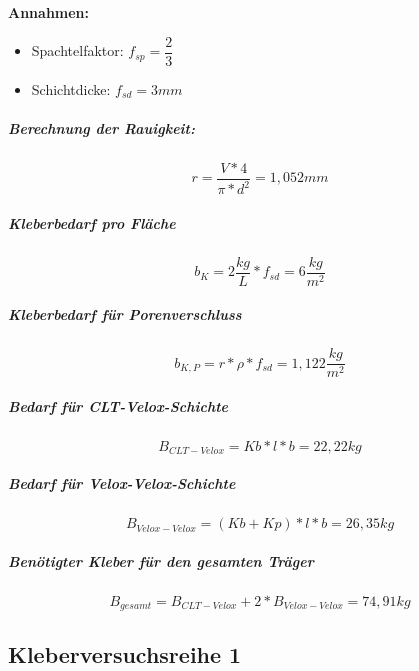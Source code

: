\documentclass[12 pt,a4 paper ]{scrreprt}
\begin{document}
\textbf{Annahmen:}

\begin{itemize}
\item Spachtelfaktor:	$f_{sp}=\dfrac{2}{3}$
\item Schichtdicke:		$f_{sd}=3mm$
\end{itemize}
 

\subparagraph{Berechnung der Rauigkeit:}
\begin{equation}
r=\dfrac{V*4}{\pi*d^{2}}=1,052 mm
\end{equation}

\subparagraph{Kleberbedarf pro Fläche}

\begin{equation}
b_{K}= 2\dfrac{kg}{L}*f_{sd}=6\dfrac{kg}{m^{2}}
\end{equation}

\subparagraph{Kleberbedarf für Porenverschluss}

\begin{equation}
b_{K,P}=r*\rho*f_{sd}= 1,122\dfrac{kg}{m^{2}}
\end{equation}

\subparagraph{Bedarf für CLT-Velox-Schichte}

\begin{equation}
B_{CLT-Velox}=Kb*l*b=22,22 kg
\end{equation}

\subparagraph{Bedarf für Velox-Velox-Schichte}

\begin{equation}
B_{Velox-Velox}=(Kb+Kp)*l*b=26,35 kg
\end{equation}


\subparagraph{Benötigter Kleber für den gesamten Träger}

\begin{equation}
B_{gesamt}=B_{CLT-Velox}+2*B_{Velox-Velox}=74,91 kg
\end{equation}




\subsection{Kleberversuchsreihe 1}
\end{document}
